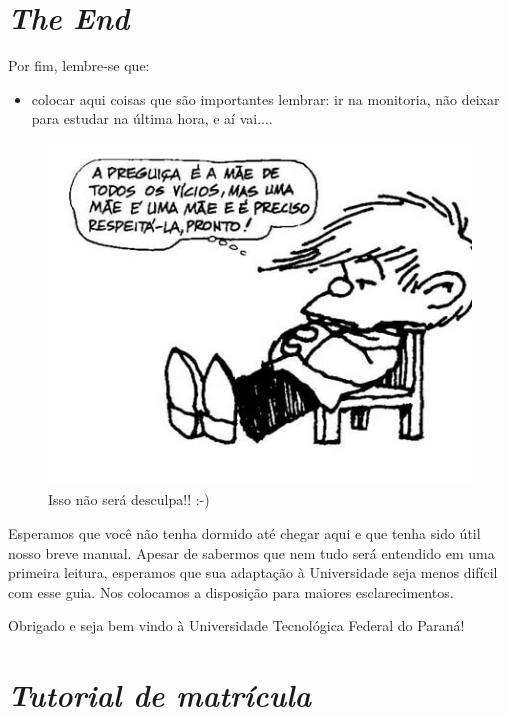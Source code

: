 \documentclass[a4paper,12pt,openany]{article}
\begin{document}
\newpage
\section{\textit{The End}}

Por fim, lembre-se que:
\begin{itemize}
\item colocar aqui coisas que são importantes lembrar: ir na monitoria, não deixar para estudar na última hora, e aí vai....

\end{itemize}

\begin{figure}[ht!]  \centering
		\includegraphics[scale=0.7]{desculpa.jpg}
		\caption{Isso não será desculpa!! :-) }
	\end{figure}


Esperamos que você não tenha dormido até chegar aqui e que tenha sido útil nosso breve manual. Apesar de sabermos que nem tudo será entendido em uma primeira leitura, esperamos que sua adaptação à Universidade seja menos difícil com esse guia. Nos colocamos a disposição para maiores esclarecimentos.

Obrigado e seja bem vindo à Universidade Tecnológica Federal do Paraná!


\newpage
\appendix
\section{\textit{Tutorial de matrícula}} \label{app:tutorial}
\end{document}
